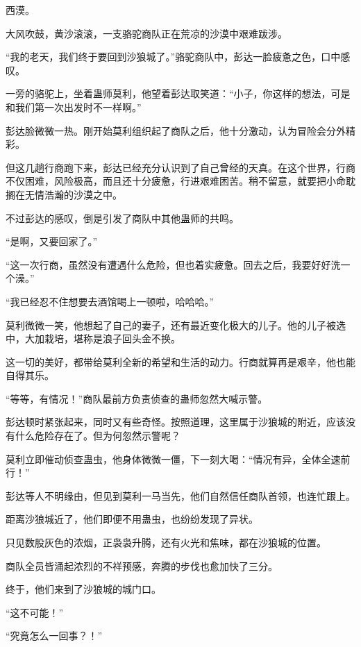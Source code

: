 
\begin{this_body}

西漠。

大风吹鼓，黄沙滚滚，一支骆驼商队正在荒凉的沙漠中艰难跋涉。

“我的老天，我们终于要回到沙狼城了。”骆驼商队中，彭达一脸疲惫之色，口中感叹。

一旁的骆驼上，坐着蛊师莫利，他望着彭达取笑道：“小子，你这样的想法，可是和我们第一次出发时不一样啊。”

彭达脸微微一热。刚开始莫利组织起了商队之后，他十分激动，认为冒险会分外精彩。

但这几趟行商跑下来，彭达已经充分认识到了自己曾经的天真。在这个世界，行商不仅困难，风险极高，而且还十分疲惫，行进艰难困苦。稍不留意，就要把小命耽搁在无情浩瀚的沙漠之中。

不过彭达的感叹，倒是引发了商队中其他蛊师的共鸣。

“是啊，又要回家了。”

“这一次行商，虽然没有遭遇什么危险，但也着实疲惫。回去之后，我要好好洗一个澡。”

“我已经忍不住想要去酒馆喝上一顿啦，哈哈哈。”

莫利微微一笑，他想起了自己的妻子，还有最近变化极大的儿子。他的儿子被选中，大加栽培，堪称是浪子回头金不换。

这一切的美好，都带给莫利全新的希望和生活的动力。行商就算再是艰辛，他也能自得其乐。

“等等，有情况！”商队最前方负责侦查的蛊师忽然大喊示警。

彭达顿时紧张起来，同时又有些奇怪。按照道理，这里属于沙狼城的附近，应该没有什么危险存在了。但为何忽然示警呢？

莫利立即催动侦查蛊虫，他身体微微一僵，下一刻大喝：“情况有异，全体全速前行！”

彭达等人不明缘由，但见到莫利一马当先，他们自然信任商队首领，也连忙跟上。

距离沙狼城近了，他们即便不用蛊虫，也纷纷发现了异状。

只见数股灰色的浓烟，正袅袅升腾，还有火光和焦味，都在沙狼城的位置。

商队全员皆涌起浓烈的不祥预感，奔腾的步伐也愈加快了三分。

终于，他们来到了沙狼城的城门口。

“这不可能！”

“究竟怎么一回事？！”


\end{this_body}

